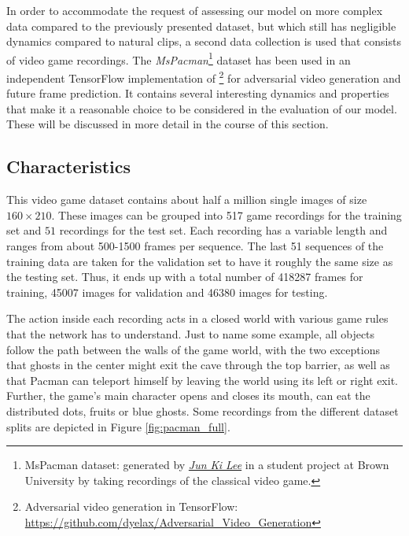 In order to accommodate the request of assessing our model on more complex data compared to the previously presented dataset, but which still has negligible dynamics compared to natural clips, a second data collection is used that consists of video game recordings. The \textit{MsPacman}\footnote{MsPacman dataset: generated by \href{mailto:jun_ki_lee@brown.edu}{\textit{Jun Ki Lee}} in a student project at Brown University by taking recordings of the classical video game.} dataset has been used in an independent TensorFlow implementation of \parencite{deep_multiscale_video_pred}\footnote{Adversarial video generation in TensorFlow:\\ \url{https://github.com/dyelax/Adversarial_Video_Generation}} for adversarial video generation and future frame prediction. It contains several interesting dynamics and properties that make it a reasonable choice to be considered in the evaluation of our model. These will be discussed in more detail in the course of this section.

\subsection{Characteristics}

This video game dataset contains about half a million single images of size $ 160 \times 210 $. These images can be grouped into \num{517} game recordings for the training set and $51$ recordings for the test set. Each recording has a variable length and ranges from about \num{500}-\num{1500} frames per sequence. The last \num{51} sequences of the training data are taken for the validation set to have it roughly the same size as the testing set. Thus, it ends up with a total number of \num{418287} frames for training, \num{45007} images for validation and \num{46380} images for testing.

The action inside each recording acts in a closed world with various game rules that the network has to understand. Just to name some example, all objects follow the path between the walls of the game world, with the two exceptions that ghosts in the center might exit the cave through the top barrier, as well as that Pacman can teleport himself by leaving the world using its left or right exit. Further, the game's main character opens and closes its mouth, can eat the distributed dots, fruits or blue ghosts. Some recordings from the different dataset splits are depicted in Figure \ref{fig:pacman_full}.

